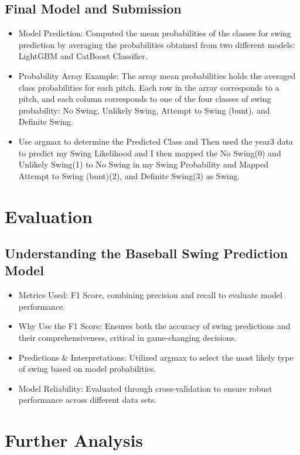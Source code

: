 \documentclass{article}
\begin{document}
\subsection*{Final Model and Submission}
\begin{itemize}
    \item Model Prediction: Computed the mean probabilities of the classes for swing prediction by averaging the probabilities obtained from two different models: LightGBM and CatBoost Classifier.
    \item Probability Array Example: 
    The array mean probabilities holds the averaged class probabilities for each pitch. Each row in the array corresponds to a pitch, and each column corresponds to one of the four classes of swing probability: No Swing, Unlikely Swing, Attempt to Swing (bunt), and Definite Swing.
    \item Use argmax to determine the Predicted Class and Then used the year3 data to predict my Swing Likelihood and I then mapped the No Swing(0) and Unlikely Swing(1) to No Swing in my Swing Probability and Mapped Attempt to Swing (bunt)(2), and Definite Swing(3) as Swing.
\end{itemize}

\section*{Evaluation}
\subsection*{Understanding the Baseball Swing Prediction Model}
\begin{itemize}
    \item Metrics Used: F1 Score, combining precision and recall to evaluate model performance.
    \item Why Use the F1 Score: Ensures both the accuracy of swing predictions and their comprehensiveness, critical in game-changing decisions.
    \item Predictions \& Interpretations: Utilized argmax to select the most likely type of swing based on model probabilities.
    \item Model Reliability: Evaluated through cross-validation to ensure robust performance across different data sets.
\end{itemize}

\section*{Further Analysis}
\end{document}
